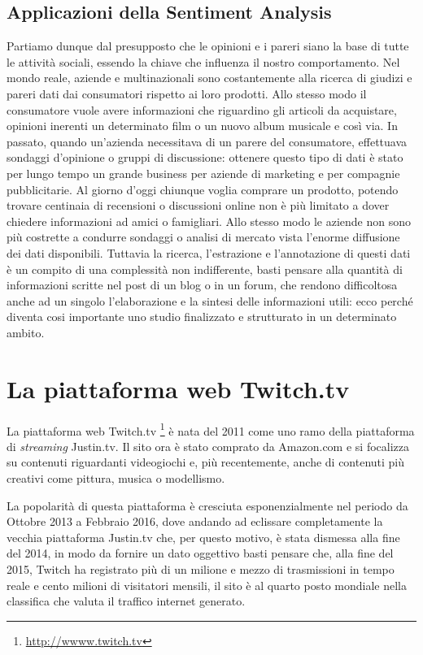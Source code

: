 \documentclass[a4paper,12pt,openright,twoside]{report}
\theoremstyle{definition}
\begin{document}
\subsection*{Applicazioni della Sentiment Analysis}
Partiamo dunque dal presupposto che le opinioni e i pareri siano la base di tutte le attività sociali,
 essendo la chiave che influenza il nostro comportamento. Nel mondo reale, aziende e multinazionali 
 sono costantemente alla ricerca di giudizi e pareri dati dai consumatori  rispetto ai loro prodotti. 
 Allo stesso modo il consumatore vuole avere informazioni che riguardino gli articoli da acquistare, 
 opinioni inerenti un determinato film o un nuovo album musicale e così via. In passato, quando un’azienda 
 necessitava di un parere del consumatore, effettuava sondaggi d’opinione o gruppi di discussione: 
 ottenere questo tipo di dati è stato per lungo tempo un grande business per aziende di marketing e 
 per compagnie pubblicitarie.
Al giorno d’oggi chiunque voglia comprare un prodotto, potendo trovare centinaia di recensioni o 
discussioni online non è più limitato a dover chiedere informazioni ad amici o famigliari. 
Allo stesso modo le aziende non sono più costrette a condurre sondaggi o analisi di mercato vista 
l’enorme diffusione dei dati disponibili. Tuttavia la ricerca, l’estrazione e l’annotazione di questi 
dati è un compito di una complessità non indifferente, basti pensare alla quantità di informazioni 
scritte nel post di un blog o in un forum, che rendono difficoltosa anche ad un singolo l'elaborazione 
e la sintesi delle informazioni utili: ecco perché diventa cosi importante uno studio finalizzato e 
strutturato in un determinato ambito.

\section*{La piattaforma web Twitch.tv}

La piattaforma web Twitch.tv \footnote{\url{http://wwww.twitch.tv}} è nata del 2011 come uno ramo
della piattaforma di \emph{streaming} Justin.tv. Il sito ora è stato comprato da Amazon.com e si
focalizza su contenuti riguardanti videogiochi e, più recentemente, anche di contenuti più creativi
come pittura, musica o modellismo.

La popolarità di questa piattaforma è cresciuta esponenzialmente nel periodo da Ottobre 2013 a Febbraio 2016, dove
andando ad eclissare completamente la vecchia piattaforma Justin.tv che, per questo motivo, 
è stata dismessa alla fine del 2014, in modo da fornire un dato oggettivo basti pensare
che, alla fine del 2015, Twitch ha registrato più di un milione e mezzo di trasmissioni
in tempo reale e cento milioni di visitatori mensili, il sito è al quarto posto mondiale nella classifica
che valuta il traffico internet generato.
\end{document}
